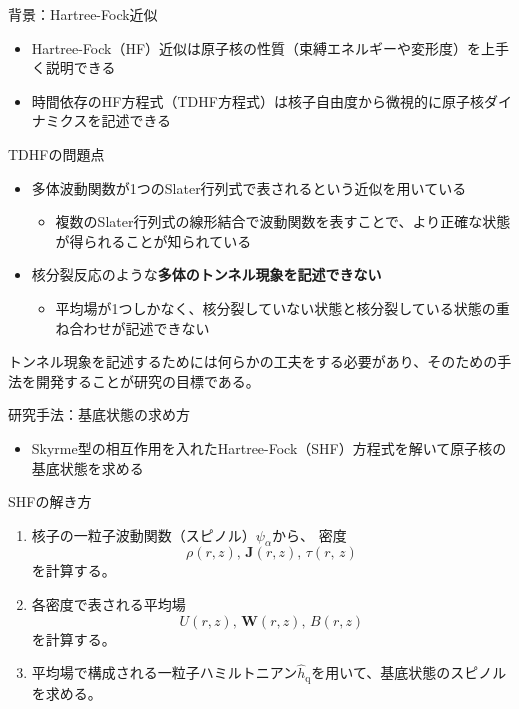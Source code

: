 \documentclass[11pt,aspectratio=169,xcolor=dvipsnames,table,dvipdfmx]{beamer}
\theoremstyle{definition}
\begin{document}
\begin{frame}{背景：Hartree-Fock近似}
  \begin{itemize}
    \item Hartree-Fock（HF）近似は原子核の性質（束縛エネルギーや変形度）を上手く説明できる
    \item 時間依存のHF方程式（TDHF方程式）は核子自由度から微視的に原子核ダイナミクスを記述できる
  \end{itemize}
  \begin{block}{TDHFの問題点}
    \begin{itemize}
      \item 多体波動関数が1つのSlater行列式で表されるという近似を用いている
            \begin{itemize}
              \item 複数のSlater行列式の線形結合で波動関数を表すことで、より正確な状態が得られることが知られている
            \end{itemize}
      \item 核分裂反応のような\textbf{多体のトンネル現象を記述できない}
            \begin{itemize}
              \item 平均場が1つしかなく、核分裂していない状態と核分裂している状態の重ね合わせが記述できない
            \end{itemize}
    \end{itemize}
  \end{block}
  トンネル現象を記述するためには何らかの工夫をする必要があり、そのための手法を開発することが研究の目標である。
\end{frame}



\begin{frame}{研究手法：基底状態の求め方}
  \begin{itemize}
    \item Skyrme型の相互作用を入れたHartree-Fock（SHF）方程式を解いて原子核の基底状態を求める
  \end{itemize}
  \begin{block}{SHFの解き方}
    \begin{enumerate}
      \item 核子の一粒子波動関数（スピノル）$\psi_{\alpha}$から、
      密度
      \begin{equation}
        \rho(r,z),\,\bm{J}(r,z),\,\tau(r,\,z)
      \end{equation}を計算する。
      \item 各密度で表される平均場
      \begin{equation}
        U(r,z),\,\bm{W}(r,z),\,B(r,z)
      \end{equation}
      を計算する。
      \item 平均場で構成される一粒子ハミルトニアン$\hat{h}_{\text{q}}$を用いて、基底状態のスピノルを求める。
    \end{enumerate}
  \end{block}
\end{frame}
\end{document}
